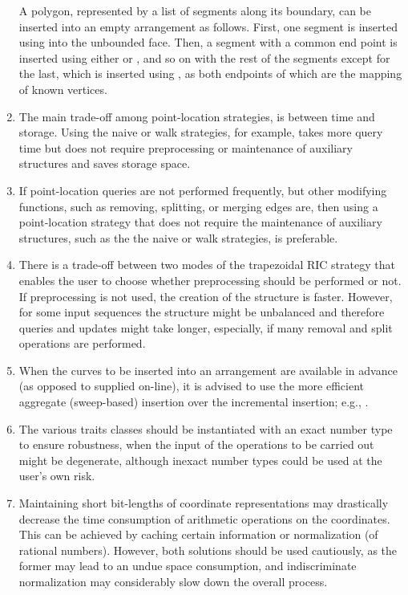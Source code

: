 \begin{enumerate}
A polygon, represented by a list of segments along its boundary, can
be inserted into an empty arrangement as follows. First, one segment
is inserted using  into the unbounded
face. Then, a segment with a common end point is inserted using either
 or ,
and so on with the rest of the segments except for the last, which is
inserted using , as both endpoints of which
are the mapping of known vertices.

\item
The main trade-off among point-location strategies, is between time
and storage. Using the naive or walk strategies, for example, takes
more query time but does not require preprocessing or maintenance of
auxiliary structures and saves storage space.

\item
If point-location queries are not performed frequently, but other
modifying functions, such as removing, splitting, or merging edges
are, then using a point-location strategy that does not require the
maintenance of auxiliary structures, such as the the naive or walk
strategies, is preferable.

\item
There is a trade-off between two modes of the trapezoidal RIC strategy
that enables the user to choose whether preprocessing should be
performed or not. If preprocessing is not used, the creation of the
structure is faster. However, for some input sequences the structure
might be unbalanced and therefore queries and updates might take
longer, especially, if many removal and split operations are
performed.

\item
When the curves to be inserted into an arrangement are available in
advance (as opposed to supplied on-line), it is advised to use the
more efficient aggregate (sweep-based) insertion over the incremental
insertion; e.g., .


\item
The various traits classes should be instantiated with an exact number
type to ensure robustness, when the input of the operations to be
carried out might be degenerate, although inexact number types could
be used at the user's own risk.

\item
Maintaining short bit-lengths of coordinate representations may
drastically decrease the time consumption of arithmetic operations on
the coordinates. This can be achieved by caching certain information
or normalization (of rational numbers). However, both solutions should
be used cautiously, as the former may lead to an undue space
consumption, and indiscriminate normalization may considerably slow
down the overall process.


\end{enumerate}
